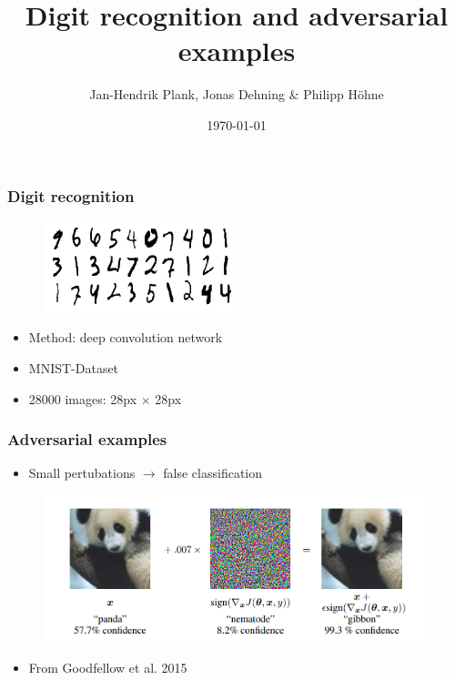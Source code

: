 \documentclass[handout]{beamer}
\begin{document}
\title{Digit recognition and adversarial examples}
\author{Jan-Hendrik Plank, Jonas Dehning \& Philipp Höhne}
\date{\today} 


\begin{frame}
\titlepage
\end{frame} 



\begin{frame}
\frametitle{Digit recognition} 
\begin{figure}
\includegraphics[width=0.5\linewidth]{./front_page.png}
\end{figure}
\begin{itemize}
\item Method: deep convolution network
\item MNIST-Dataset
\item 28000 images: 28px $\times$ 28px
\end{itemize}
\end{frame} 

\begin{frame}
\frametitle{Adversarial examples}
\begin{itemize}
\item Small pertubations $\rightarrow$ false classification
\end{itemize}
\begin{figure}
\includegraphics[width=0.9\linewidth]{./PandaGibbon}
\end{figure}
\begin{itemize}
\item From Goodfellow et al. 2015
\end{itemize}
\end{frame}
\end{document}
